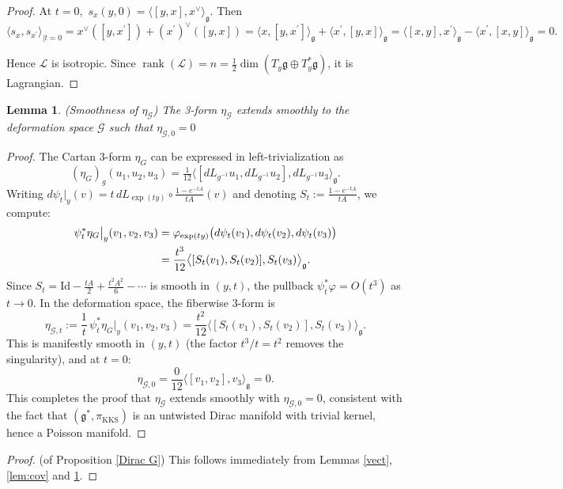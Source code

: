 \documentclass[reqno]{amsart}
\theoremstyle{plain}
\newtheorem{Lem}[Thm]{Lemma}
\theoremstyle{definition}
\newcommand{\G}{\mathcal{G}}
\newcommand{\g}{\mathfrak{g}}
\begin{document}
\begin{proof}
At $t = 0,$ $s_{x}(y,0) = \langle [y,x],x^\vee \rangle_{\g}.$ Then \[
\langle s_x,s_{x^{'}}\rangle_{|t = 0} = x^{\vee}([y,x^{'}]) + (x^{'})^{\vee}([y,x]) = \langle x,[y,x^{'}] \rangle_{\g} + \langle x^{'},[y,x]\rangle_{\g} = \langle [x,y],x^{'} \rangle_{\g} - \langle x^{'},[x,y]\rangle_{\g} = 0.
\] 



Hence $\mathcal{L}$ is isotropic. Since $\operatorname{rank}(\mathcal{L}) = n = \frac{1}{2}\dim(T_y\g \oplus T_y^*\g)$, it is Lagrangian.

\end{proof}
 
\begin{Lem}(Smoothness of $\eta_{\G}$) \label{smooth eta}
The 3-form $\eta_{\G}$ extends smoothly to the deformation space $\G$ such that $\eta_{\G,0} = 0$
\end{Lem}

\begin{proof}
The Cartan 3-form $\eta_G$ can be expressed in left-trivialization as
\[
(\eta_{G})_g(u_1, u_2, u_3) = \tfrac{1}{12}\big\langle [dL_{g^{-1}}u_1, dL_{g^{-1}}u_2], dL_{g^{-1}}u_3\big\rangle_\g.
\]
Writing $d\psi_t|_y(v) = t\,dL_{\exp(ty)} \circ \frac{1 - e^{-tA}}{tA}(v)$ and denoting $S_t := \frac{1-e^{-tA}}{tA}$, we compute:
\begin{align}
\psi_t^*\eta_{G}\big|_y(v_1,v_2,v_3)
&= \varphi_{\exp(ty)}\big(d\psi_t(v_1), d\psi_t(v_2), d\psi_t(v_3)\big) \notag\\
&= \frac{t^3}{12}\big\langle [S_t(v_1), S_t(v_2)], S_t(v_3)\big\rangle_\g. \label{eq:pullback-phi}
\end{align}
Since $S_t = \mathrm{Id} - \frac{tA}{2} + \frac{t^2A^2}{6} - \cdots$ is smooth in $(y,t)$, the pullback $\psi_t^*\varphi = O(t^3)$ as $t \to 0$. In the deformation space, the fiberwise 3-form is
\[
\eta_{\mathcal{G},t} := \frac{1}{t}\,\psi_t^*\eta_{G}\big|_y(v_1,v_2,v_3) = \frac{t^2}{12}\big\langle[S_t(v_1),S_t(v_2)],S_t(v_3)\big\rangle_\g.
\]
This is manifestly smooth in $(y,t)$ (the factor $t^3/t = t^2$ removes the singularity), and at $t=0$:
\[
\eta_{\mathcal{G},0} = \frac{0}{12}\big\langle [v_1, v_2], v_3 \big\rangle_\g = 0.
\]
This completes the proof that $\eta_\mathcal{G}$ extends smoothly with $\eta_{\mathcal{G},0} = 0$, consistent with the fact that $(\g^*, \pi_{\mathrm{KKS}})$ is an untwisted Dirac manifold with trivial kernel, hence a Poisson manifold.
\end{proof}

\begin{proof}(of Proposition \ref{Dirac G})
This follows immediately from Lemmas \ref{vect}, \ref{lem:cov} and \ref{smooth eta}.
\end{proof}
\end{document}
